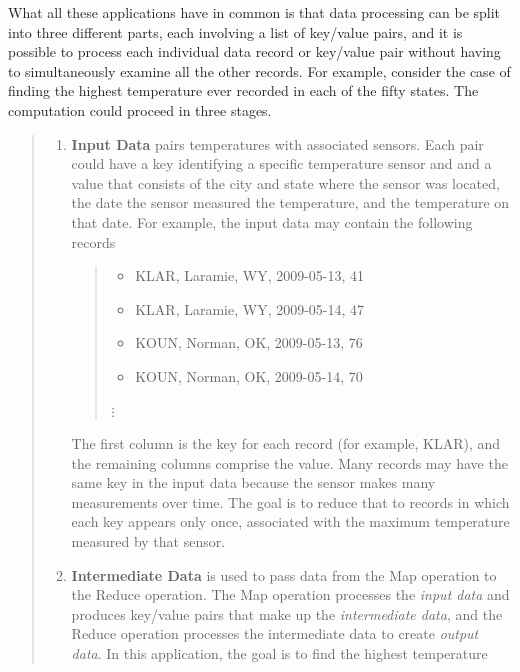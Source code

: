 What all these applications have in common is that data processing
can be split into three different parts, each involving a list of
key/value pairs, and it is possible to process each individual
data record or key/value pair without having to simultaneously
examine all the other records.  For
example, consider the case of finding the highest
temperature ever recorded in each of the fifty states.
The computation could proceed in three stages.
\begin{quote}
\begin{enumerate}
    \item \textbf{Input Data} pairs temperatures with associated sensors.
        Each pair could have a key identifying a
        specific temperature sensor and
        and a value that consists of the city and state where
        the sensor was located, the date the sensor measured
        the temperature, and the temperature on that date.
        For example, the input data may contain the following
        records
        \begin {quote}
        \begin{itemize}
            \item \textsf{KLAR, Laramie, WY, 2009-05-13, 41}
            \item \textsf{KLAR, Laramie, WY, 2009-05-14, 47}
            \item \textsf{KOUN, Norman,  OK, 2009-05-13, 76}
            \item \textsf{KOUN, Norman,  OK, 2009-05-14, 70}
        \end{itemize}
        \hspace*{1cm}$\vdots$
        \end{quote}
        The first column is the key for each record (for example, KLAR),
        and the remaining columns comprise the value. Many
        records may have the same key in the input data because the
        sensor makes many measurements over time.
        The goal is to reduce that to records
        in which each key appears only once,
        associated with the maximum temperature measured by that sensor.
    \item \textbf{Intermediate Data} is used to pass data from
        the Map operation to the Reduce operation. The Map operation
        processes the \emph{input data} and produces key/value pairs
        that make up the \emph{intermediate data}, and the Reduce operation
        processes the intermediate data to create \emph{output data}.
        In this application, the goal is to find the highest temperature

\end{enumerate}
\end{quote}
